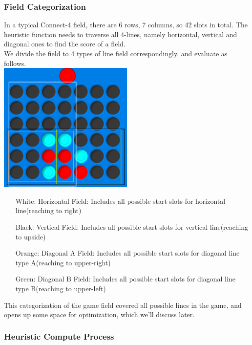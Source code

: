 \documentclass[12pt,a4paper]{article}
\begin{document}
	\subsubsection{Field Categorization}
	In a typical Connect-4 field, there are 6 rows, 7 columns, so 42 slots in total. The heuristic function needs to traverse all 4-lines, namely horizontal, vertical and diagonal ones to find the score of a field.\\
	
	We divide the field to 4 types of line field correspondingly, and evaluate as follows.\\
	
	{\centering\includegraphics[width=0.5\textwidth]{LineField.png}~\\}
	
	\begin{enumerate}
		\item [White:] Horizontal Field: Includes all possible start slots for horizontal line(reaching to right)
		\item [Black:] Vertical Field: Includes all possible start slots for vertical line(reaching to upside)
		\item [Orange:] Diagonal A Field: Includes all possible start slots for diagonal line type A(reaching to upper-right)
		\item [Green:] Diagonal B Field: Includes all possible start slots for diagonal line type B(reaching to upper-left)
	\end{enumerate}

	This categorization of the game field covered all possible lines in the game, and opens up some space for optimization, which we'll discuss later.
	
	\subsubsection{Heuristic Compute Process}
	
\end{document}

